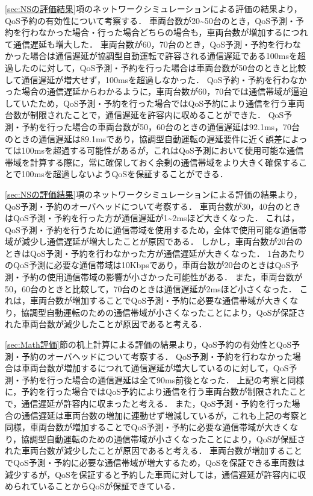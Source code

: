\documentclass[a4paper,11pt,uplatex]{ujreport}
\begin{document}
  \ref{sec:NSの評価結果}項のネットワークシミュレーションによる評価の結果より，QoS予約の有効性について考察する．
  車両台数が20\textasciitilde50台のとき，QoS予測・予約を行わなかった場合・行った場合どちらの場合も，車両台数が増加するにつれて通信遅延も増大した．
  車両台数が60，70台のとき，QoS予測・予約を行わなかった場合は通信遅延が協調型自動運転で許容される通信遅延である100msを超過したのに対して，QoS予測・予約を行った場合は車両台数が50台のときと比較して通信遅延が増大せず，100msを超過しなかった．
  QoS予約・予約を行わなかった場合の通信遅延からわかるように，車両台数が60，70台では通信帯域が逼迫していたため，QoS予測・予約を行った場合ではQoS予約により通信を行う車両台数が制限されたことで，通信遅延を許容内に収めることができた．
  QoS予測・予約を行った場合の車両台数が50，60台のときの通信遅延は92.1ms，70台のときの通信遅延は89.1msであり，協調型自動運転の遅延要件に近く誤差によっては100msを超過する可能性があるが，これはQoS予測において使用可能な通信帯域を計算する際に，常に確保しておく余剰の通信帯域をより大きく確保することで100msを超過しないようQoSを保証することができる．\par
  \ref{sec:NSの評価結果}項のネットワークシミュレーションによる評価の結果より，QoS予測・予約のオーバヘッドについて考察する．
  車両台数が30，40台のときはQoS予測・予約を行った方が通信遅延が1\textasciitilde2msほど大きくなった．
  これは，QoS予測・予約を行うために通信帯域を使用するため，全体で使用可能な通信帯域が減少し通信遅延が増大したことが原因である．
  しかし，車両台数が20台のときはQoS予測・予約を行わなかった方が通信遅延が大きくなった．
  1台あたりのQoS予測に必要な通信帯域は10Kbpsであり，車両台数が20台のときはQoS予測・予約の使用通信帯域の影響が小さかった可能性がある．
  また，車両台数が50，60台のときと比較して，70台のときは通信遅延が2msほど小さくなった．
  これは，車両台数が増加することでQoS予測・予約に必要な通信帯域が大きくなり，協調型自動運転のための通信帯域が小さくなったことにより，QoSが保証された車両台数が減少したことが原因であると考える．\par
  \ref{sec:Math評価}節の机上計算による評価の結果より，QoS予約の有効性とQoS予測・予約のオーバヘッドについて考察する．
  QoS予測・予約を行わなかった場合は車両台数が増加するにつれて通信遅延が増大しているのに対して，QoS予測・予約を行った場合の通信遅延は全て90ms前後となった．
  上記の考察と同様に，予約を行った場合ではQoS予約により通信を行う車両台数が制限されたことで，通信遅延が許容内に収まったと考える．
  また，QoS予測・予約を行った場合の通信遅延は車両台数の増加に連動せず増減しているが，これも上記の考察と同様，車両台数が増加することでQoS予測・予約に必要な通信帯域が大きくなり，協調型自動運転のための通信帯域が小さくなったことにより，QoSが保証された車両台数が減少したことが原因であると考える．
  車両台数が増加することでQoS予測・予約に必要な通信帯域が増大するため，QoSを保証できる車両数は減少するが，QoSを保証すると予約した車両に対しては，通信遅延が許容内に収められていることからQoSが保証できている．
\end{document}
